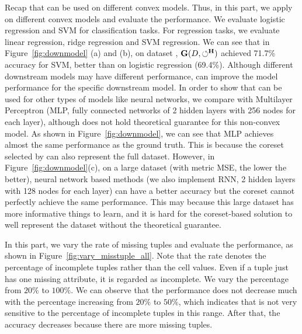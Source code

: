  Recap that \ours can be used on different convex models. Thus, in this part, we apply \ours on different convex models and evaluate the performance. We evaluate logistic regression and SVM for classification tasks. For regression tasks, we evaluate linear regression, ridge regression and SVM regression. We can see that  in Figure~\ref{fig:downmodel} (a) and (b), on dataset \adult, $\mathbf{G}(D,\circlearrowleft^\mathbf{H})$ achieved 71.7\% accuracy for SVM, better than on logistic regression (69.4\%). Although different downstream models may have different performance, \ours can improve the model performance for the specific downstream model. In order to show that \ours can be used for other types of models like neural networks, we compare with Multilayer Perceptron (MLP, fully connected networks of 2 hidden layers with 256 nodes for each layer), although \ours does not hold
theoretical guarantee for this non-convex model. As shown in Figure~\ref{fig:downmodel}, we can see that MLP achieves almost the same performance as the ground truth. This is because the coreset selected by \ours can also represent the full dataset. However, in Figure~\ref{fig:downmodel}(c), on a large dataset \air (with metric MSE, the lower the better), neural network based methods (we also implement RNN, 2 hidden layers with 128 nodes for each layer) can have a better accuracy but the coreset cannot perfectly achieve the same performance. %
This may because this large dataset has more informative things to learn, and it is hard for the coreset-based solution to well represent the dataset without the theoretical guarantee.




 In this part, we vary the rate of missing tuples and evaluate the performance, as shown in Figure~\ref{fig:vary_misstuple_all}. 
Note that the rate  denotes the percentage of incomplete tuples rather than the cell values. Even if a tuple just has one missing attribute, it is regarded as incomplete.	
	We vary the percentage  from $20\%$ to $100\%$. We can observe that the performance does not decrease  much with the percentage increasing from $20\%$ to $50\%$, which indicates that \ours is not very sensitive to the percentage of incomplete tuples in this range. After that, the accuracy decreases because there are more missing tuples.

